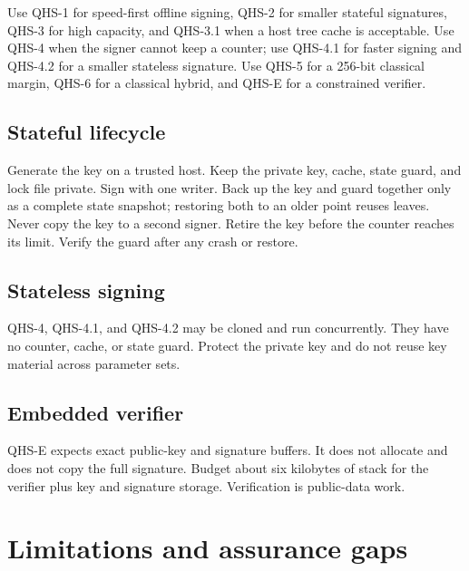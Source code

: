 \documentclass[11pt,a4paper]{article}
\theoremstyle{remark}
\begin{document}
Use QHS-1 for speed-first offline signing, QHS-2 for smaller stateful
signatures, QHS-3 for high capacity, and QHS-3.1 when a host tree cache is
acceptable. Use QHS-4 when the signer cannot keep a counter; use QHS-4.1 for
faster signing and QHS-4.2 for a smaller stateless signature. Use QHS-5 for a
256-bit classical margin, QHS-6 for a classical hybrid, and QHS-E for a
constrained verifier.

\subsection{Stateful lifecycle}

Generate the key on a trusted host. Keep the private key, cache, state guard, and
lock file private. Sign with one writer. Back up the key and guard together only
as a complete state snapshot; restoring both to an older point reuses leaves.
Never copy the key to a second signer. Retire the key before the counter reaches
its limit. Verify the guard after any crash or restore.

\subsection{Stateless signing}

QHS-4, QHS-4.1, and QHS-4.2 may be cloned and run concurrently. They have no
counter, cache, or state guard. Protect the private key and do not reuse key
material across parameter sets.

\subsection{Embedded verifier}

QHS-E expects exact public-key and signature buffers. It does not allocate and
does not copy the full signature. Budget about six kilobytes of stack for the
verifier plus key and signature storage. Verification is public-data work.

\section{Limitations and assurance gaps}
\end{document}
